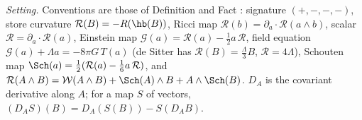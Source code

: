 \emph{Setting.} Conventions are those of Definition  and Fact : signature $(+,-,-,-)$, store curvature $\mathcal{R}(B) = -R(\hb(B))$, Ricci map $\mathcal{R}(b) = \partial_{a} \cdot \mathcal{R}(a \wedge b)$, scalar $\mathcal{R} = \partial_{a} \cdot \mathcal{R}(a)$, Einstein map $\mathcal{G}(a) = \mathcal{R}(a) - \tfrac12 a\,\mathcal{R}$, field equation $\mathcal{G}(a) + \Lambda a = -8\pi G\,T(a)$ (de Sitter has $\mathcal{R}(B) = \tfrac{\Lambda}{3}B$, $\mathcal{R} = 4\Lambda$), Schouten map $\Sch(a) = \tfrac12(\mathcal{R}(a) - \tfrac16 a\,\mathcal{R})$, and $\mathcal{R}(A \wedge B) = \mathcal{W}(A \wedge B) + \Sch(A) \wedge B + A \wedge \Sch(B)$. $D_{A}$ is the covariant derivative along $A$; for a map $S$ of vectors, $(D_{A}S)(B) = D_{A}(S(B)) - S(D_{A}B)$.

